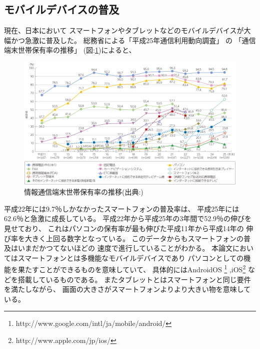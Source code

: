 \subsection{モバイルデバイスの普及}
現在、日本において
スマートフォンやタブレットなどのモバイルデバイスが大幅かつ急激に普及した。
総務省による「平成25年通信利用動向調査」
\cite{communicationreport}の
「通信端末世帯保有率の推移」
(図:\ref{fig:mobiledevicespread})によると、
\begin{figure}[htbp]
  \begin{center}
    \includegraphics[width=160mm,bb=0 0 856 494]{images/mobiledevicespread.png}
  \end{center}
  \caption{情報通信端末世帯保有率の推移(出典:\cite{communicationreport})}
  \label{fig:mobiledevicespread}
\end{figure}
平成22年には9.7％しかなかったスマートフォンの普及率は、
平成25年には62.6％と急激に成長している。
平成22年から平成25年の3年間で52.9％の伸びを見せており、
これはパソコンの保有率が最も伸びた平成11年から平成14年の
伸び率を大きく上回る数字となっている。
このデータからもスマートフォンの普及はいまだかつてないほどの
速度で進行していることがわかる。
本論文においてはスマートフォンとは多機能なモバイルデバイスであり
パソコンとしての機能を果たすことができるものを意味していて、
具体的にはAndroidOS
\footnote{http://www.google.com/intl/ja/mobile/android/}
,iOS\footnote{http://www.apple.com/jp/ios/}
などを搭載しているものである。
またタブレットとはスマートフォンと同じ要件を満たしながら、
画面の大きさがスマートフォンよりより大きい物を意味している。


